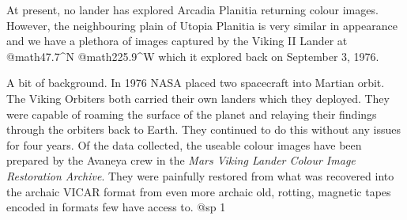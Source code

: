 
At present, no lander has explored Arcadia Planitia returning colour images. However, the neighbouring plain of Utopia Planitia is very similar in appearance and we have a plethora of images captured by the Viking II Lander at @math{47.7^{\circ}}N @math{225.9^{\circ}}W which it explored back on September 3, 1976.

A bit of background. In 1976 NASA placed two spacecraft into Martian orbit. The Viking Orbiters both carried their own landers which they deployed. They were capable of roaming the surface of the planet and relaying their findings through the orbiters back to Earth. They continued to do this without any issues for four years. Of the data collected, the useable colour images have been prepared by the Avaneya crew in the {\it Mars Viking Lander Colour Image Restoration Archive}. They were painfully restored from what was recovered into the archaic VICAR format from even more archaic old, rotting, magnetic tapes encoded in formats few have access to.
@sp 1



